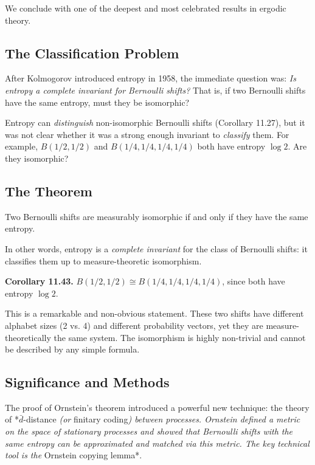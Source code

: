 We conclude with one of the deepest and most celebrated results in ergodic theory.

\subsection{The Classification Problem}\label{sec:11.10.1}

After Kolmogorov introduced entropy in 1958, the immediate question was: \textit{Is entropy a complete invariant for Bernoulli shifts?} That is, if two Bernoulli shifts have the same entropy, must they be isomorphic?

Entropy can \textit{distinguish} non-isomorphic Bernoulli shifts (Corollary 11.27), but it was not clear whether it was a strong enough invariant to \textit{classify} them. For example, $B(1/2, 1/2)$ and $B(1/4, 1/4, 1/4, 1/4)$ both have entropy $\log 2$. Are they isomorphic?

\subsection{The Theorem}\label{sec:11.10.2}

\begin{theorem}[Ornstein, 1970]\label{thm:11.42}
Two Bernoulli shifts are measurably isomorphic if and only if they have the same entropy.

In other words, entropy is a \textit{complete invariant} for the class of Bernoulli shifts: it classifies them up to measure-theoretic isomorphism.
\end{theorem}


\textbf{Corollary 11.43.} $B(1/2, 1/2) \cong B(1/4, 1/4, 1/4, 1/4)$, since both have entropy $\log 2$.

This is a remarkable and non-obvious statement. These two shifts have different alphabet sizes (2 vs. 4) and different probability vectors, yet they are measure-theoretically the same system. The isomorphism is highly non-trivial and cannot be described by any simple formula.

\subsection{Significance and Methods}\label{sec:11.10.3}

The proof of Ornstein's theorem introduced a powerful new technique: the theory of *$\bar{d}$-distance\textit{ (or }finitary coding\textit{) between processes. Ornstein defined a metric on the space of stationary processes and showed that Bernoulli shifts with the same entropy can be approximated and matched via this metric. The key technical tool is the }Ornstein copying lemma*.

